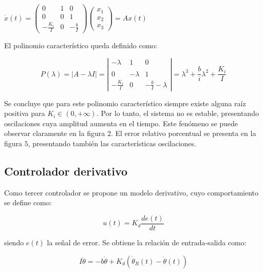 \documentclass{sig-alternate}
\begin{document}
\begin{center}
$
\dot x(t) = 
\left( \begin{array}{ccc}
0 & 1 & 0\\
0 & 0 & 1\\
-\frac{K_i}{I} & 0 & -\frac{b}{I}
\end{array} \right)
\left( \begin{array}{c}
x_1 \\
x_2 \\
x_3
\end{array} \right)
= Ax(t)
$
\end{center}

El polinomio caracter\'istico queda definido como:

\begin{equation}
 P( \lambda ) = |A - \lambda I| = 
\left| \begin{array}{ccc}
-\lambda & 1 & 0\\
\\ 0 & -\lambda & 1 \\
-\frac{K_i}{I} & 0 & -\frac{b}{I}-\lambda
\end{array} \right| 
=
\lambda^3 + \frac{b}{i}\lambda^2 + \frac{K_i}{I}
\end{equation}

Se concluye que para este polinomio caracter\'istico 
siempre existe alguna ra\'iz positiva para $K_i \in (0,+\infty)$. Por lo tanto, 
el sistema no es estable, presentando oscilaciones cuya amplitud aumenta
en el tiempo. Este fen\'{o}meno se puede observar claramente en la figura $2$.
El error relativo porcentual se presenta en la figura $5$, presentando tambi\'{e}n
las caracter\'{i}sticas oscilaciones.

\subsection{Controlador derivativo}\label{derivativo}
Como tercer controlador se propone un modelo derivativo, cuyo comportamiento
se define como:

\begin{equation}
\label{error_modelo3}
u(t) = K_d \frac{d e(t)}{d t}
\end{equation}

siendo $e(t)$ la se\~{n}al de error. Se obtiene la relaci\'{o}n de entrada-salida 
como:

\begin{equation}
\label{ecuacion_modelo2}
I \ddot\theta = - b \dot\theta + K_d (\dot\theta_R(t) - \dot\theta(t))
\end{equation}
\end{document}
